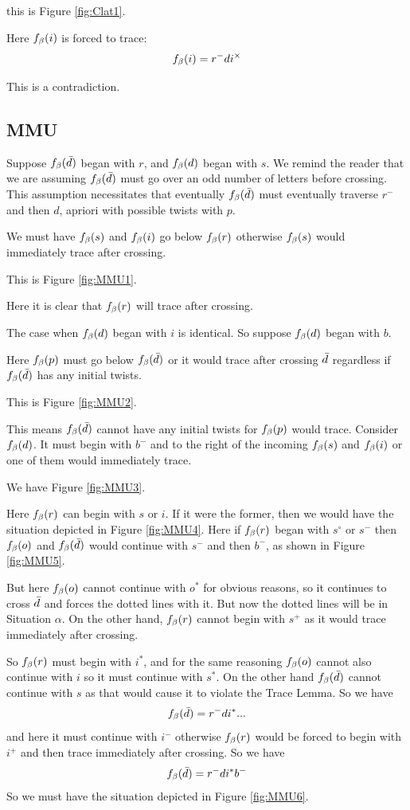this is Figure \ref{fig:Clat1}.

Here $f_\beta(i)$ is forced to trace:
\[
f_\beta(i) = r^- d i^\times
\]

This is a contradiction.

\subsection{MMU}\label{MMU}
Suppose $f_\beta(\bar{d})$ began with $r$, and $f_\beta(d)$ began with $s$.
We remind the reader that we are assuming $f_\beta(\bar{d})$ must go over an odd number of letters before crossing. This assumption necessitates that eventually $f_\beta(\bar{d})$ must eventually traverse $r^-$ and then $d$, apriori with possible twists with $p$.

We must have $f_\beta(s)$ and $f_\beta(i)$ go below $f_\beta(r)$ otherwise $f_\beta(s)$ would immediately trace after crossing.

This is Figure \ref{fig:MMU1}.

Here it is clear that $f_\beta(r)$ will trace after crossing.

The case when $f_\beta(d)$ began with $i$ is identical. So suppose $f_\beta(d)$ began with $b$. 


Here $f_\beta(p)$ must go below $f_\beta(\bar{d})$ or it would trace after crossing $\bar{d}$ regardless if $f_\beta(\bar{d})$ has any initial twists.

This is Figure \ref{fig:MMU2}.

This means $f_\beta(\bar{d})$ cannot have any initial twists for $f_\beta(p)$ would trace. Consider $f_\beta(d)$. It must begin with $b^-$ and to the right of the incoming $f_\beta(s)$ and $f_\beta(i)$ or one of them would immediately trace.

We have Figure \ref{fig:MMU3}.

Here $f_\beta(r)$ can begin with $s$ or $i$. If it were the former, then we would have the situation depicted in Figure \ref{fig:MMU4}. Here if $f_\beta(r)$ began with $s^\circ$ or $s^-$ then $f_\beta(o)$ and $f_\beta(\bar{d})$ would continue with $s^-$ and then $b^-$, as shown in Figure \ref{fig:MMU5}.

But here $f_\beta(o)$ cannot continue with $o^*$ for obvious reasons, so it continues to cross $\bar{d}$ and forces the dotted lines with it. But now the dotted lines will be in Situation $\alpha$. On the other hand, $f_\beta(r)$ cannot begin with $s^+$ as it would trace immediately after crossing.

So $f_\beta(r)$ must begin with $i^*$, and for the same reasoning $f_\beta(o)$ cannot also continue with $i$ so it must continue with $s^*$. On the other hand $f_\beta(\bar{d})$ cannot continue with $s$ as that would cause it to violate the Trace Lemma. So we have
\[
f_\beta(\bar{d}) = r^- d i^*...
\]
and here it must continue with $i^-$ otherwise $f_\beta(r)$ would be forced to begin with $i^+$ and then trace immediately after crossing. So we have
\[
f_\beta(\bar{d}) = r^- d i^* b^-
\]
So we must have the situation depicted in Figure \ref{fig:MMU6}.

